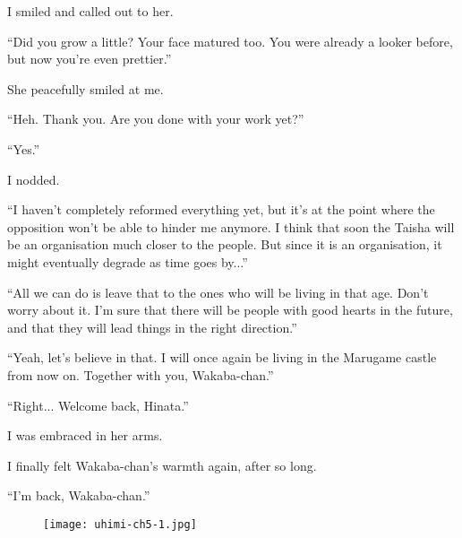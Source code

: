 I smiled and called out to her.

``Did you grow a little? Your face matured too. You were already a looker before, but now you're even prettier.''

She peacefully smiled at me.

``Heh. Thank you. Are you done with your work yet?''

``Yes.''

I nodded.

``I haven't completely reformed everything yet, but it's at the point where the opposition won't be able to hinder me anymore. I think that soon the Taisha will be an organisation much closer to the people. But since it is an organisation, it might eventually degrade as time goes by...''

``All we can do is leave that to the ones who will be living in that age. Don't worry about it. I'm sure that there will be people with good hearts in the future, and that they will lead things in the right direction.''

``Yeah, let's believe in that. I will once again be living in the Marugame castle from now on. Together with you, Wakaba-chan.''

``Right... Welcome back, Hinata.''

I was embraced in her arms.

I finally felt Wakaba-chan's warmth again, after so long.

``I'm back, Wakaba-chan.''

\begin{figure}[p]
\texttt{[image: uhimi-ch5-1.jpg]}
\end{figure}

